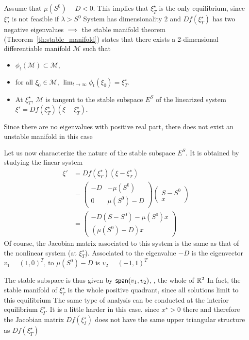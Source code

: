 \documentclass[aspectratio=169]{beamer}
\begin{document}
\begin{frame}
Assume that
$\mu(S^0)-D<0$. This implies that $\xi_T^\star$ is the only
equilibrium, since $\xi_I^\star$ is not feasible
if $\lambda>S^0$
\vfill
System has dimensionality 2 and $Df(\xi_T^\star)$
has two negative eigenvalues $\implies$ the stable manifold theorem
(Theorem~\ref{th:stable_manifold}) states that there exists a
2-dimensional differentiable manifold $\mathcal{M}$ such that
\begin{itemize}
\item $\phi_t(\mathcal{M})\subset\mathcal{M}$,
\item for all $\xi_0\in\mathcal{M}$,
$\lim_{t\to\infty}\phi_t(\xi_0)=\xi_T^\star$.
\item At $\xi_T^\star$, $\mathcal{M}$ is tangent to the stable subspace
$E^S$ of the linearized system $\xi'=Df(\xi_T^\star)(\xi-\xi_T^\star)$.
\end{itemize}
Since there are no eigenvalues with positive real part, there does not
exist an unstable manifold in this case 
\end{frame}

\begin{frame}
Let us now characterize the
nature of the stable subspace $E^S$. It is obtained by studying the
linear system
\begin{align}
\xi' &= Df(\xi_T^\star)(\xi-\xi_T^\star) \nonumber \\
&= \left(
\begin{matrix}
-D & -\mu(S^0) \\
0 & \mu(S^0)-D
\end{matrix}
\right)
\left(
\begin{matrix}
S-S^0 \\
x
\end{matrix}
\right) \nonumber \\
&= \left(
\begin{matrix}
-D(S-S^0)-\mu(S^0)x \\
(\mu(S^0)-D)x
\end{matrix}
\right)
\end{align}
Of course, the Jacobian matrix associated to this system is the same
as that of the nonlinear system (at $\xi_T^\star$). Associated to the
eigenvalue $-D$ is the eigenvector $v_1=(1,0)^T$, to $\mu(S^0)-D$ is
$v_2=(-1,1)^T$
\end{frame}

\begin{frame} 
The stable subspace is thus given by $\mathsf{span}(v_1,v_2)$, \ie,
the whole of $\mathbb{R}^2$
\vfill
In fact, the stable manifold of $\xi_T^\star$ is the whole positive
quadrant, since all solutions limit to this equilibrium 
\vfill
The same type of analysis can be conducted at the interior equilibrium $\xi_I^\star$. It is a little harder in this case, since $x^\star>0$ there and therefore the Jacobian matrix $Df(\xi_I^\star)$ does not have the same upper triangular structure as $Df(\xi_T^\star)$
\end{frame}
\end{document}
